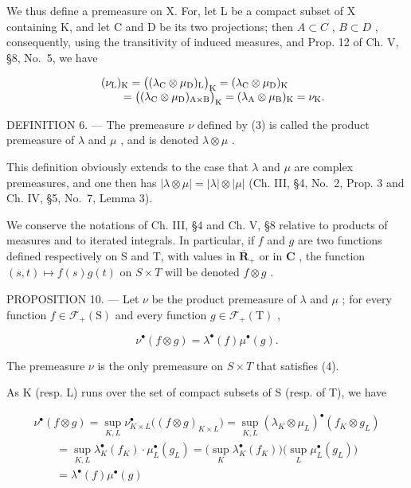 We thus define a premeasure on X. For, let L be a compact subset of X containing K, and let C and D be its two projections; then \(A \subset C\) , \(B \subset D\) , consequently, using the transitivity of induced measures, and Prop. 12 of Ch. V, §8, No.~5, we have

\[
\begin{array}{r l} & {(\nu_ {\mathrm{L}}) _ {\mathrm{K}} = \big ((\lambda_ {\mathrm{C}} \otimes \mu_ {\mathrm{D}}) _ {\mathrm{L}} \big) _ {\mathrm{K}} = (\lambda_ {\mathrm{C}} \otimes \mu_ {\mathrm{D}}) _ {\mathrm{K}}} \\ & {\qquad = \big ((\lambda_ {\mathrm{C}} \otimes \mu_ {\mathrm{D}}) _ {\mathrm{A} \times \mathrm{B}} \big) _ {\mathrm{K}} = (\lambda_ {\mathrm{A}} \otimes \mu_ {\mathrm{B}}) _ {\mathrm{K}} = \nu_ {\mathrm{K}}.} \end{array}
\]

DEFINITION 6. --- The premeasure \(\nu\) defined by (3) is called the product premeasure of \(\lambda\) and \(\mu\) , and is denoted \(\lambda \otimes \mu\) .

This definition obviously extends to the case that \(\lambda\) and \(\mu\) are complex premeasures, and one then has \(|\lambda\otimes\mu|=|\lambda|\otimes|\mu|\) (Ch. III, §4, No.~2, Prop. 3 and Ch. IV, §5, No.~7, Lemma 3).

We conserve the notations of Ch. III, §4 and Ch. V, §8 relative to products of measures and to iterated integrals. In particular, if \(f\) and \(g\) are two functions defined respectively on S and T, with values in \(\overline{\mathbf{R}}_+\) or in \(\mathbf{C}\) , the function \((s,t)\mapsto f(s)g(t)\) on \(S\times T\) will be denoted \(f\otimes g\) .

PROPOSITION 10. --- Let \(\nu\) be the product premeasure of \(\lambda\) and \(\mu\) ; for every function \(f \in \mathcal{F}_{+}(\mathrm{S})\) and every function \(g \in \mathcal{F}_{+}(\mathrm{T})\) ,

\[
\nu^ {\bullet} (f \otimes g) = \lambda^ {\bullet} (f) \mu^ {\bullet} (g).\tag{4}
\]

The premeasure \(\nu\) is the only premeasure on \(S \times T\) that satisfies (4).

As K (resp. L) runs over the set of compact subsets of S (resp. of T), we have

\[
\begin{array}{l} \nu^ {\bullet} (f \otimes g) = \sup _ {K, L} \nu_ {K \times L} ^ {\bullet} \big ((f \otimes g) _ {K \times L} \big) = \sup _ {K, L} (\lambda_ {K} \otimes \mu_ {L}) ^ {\bullet} (f _ {K} \otimes g _ {L}) \\ \qquad = \sup _ {K, L} \lambda_ {K} ^ {\bullet} (f _ {K}) \cdot \mu_ {L} ^ {\bullet} (g _ {L}) = \big (\sup _ {K} \lambda_ {K} ^ {\bullet} (f _ {K}) \big) \big (\sup _ {L} \mu_ {L} ^ {\bullet} (g _ {L}) \big) \\ \qquad = \lambda^ {\bullet} (f) \mu^ {\bullet} (g) \end{array}
\]

